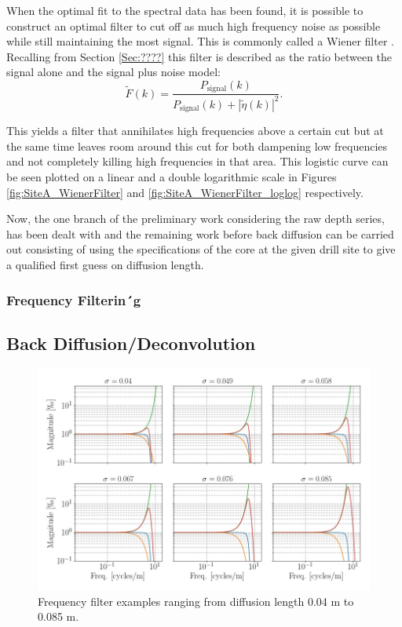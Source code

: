 \documentclass[../../CompleteThesis/Complete_1stDraft.tex]{subfiles}
\begin{document}
When the optimal fit to the spectral data has been found, it is possible to construct an optimal filter to cut off as much high frequency noise as possible while still maintaining the most signal. This is commonly called a Wiener filter . Recalling from Section \ref{Sec:????} this filter is described as the ratio between the signal alone and the signal plus noise model:
\begin{equation}
	\tilde{F}(k) = \frac{P_{\text{signal}}(k)}{P_{\text{signal}}(k) + |\tilde{\eta}(k)|^2}.
	\label{Eq:MethodWienerFilter}
\end{equation}

This yields a filter that annihilates high frequencies above a certain cut but at the same time leaves room around this cut for both dampening low frequencies and not completely killing high frequencies  in that area. 
This logistic curve can be seen plotted on a linear and a double logarithmic scale in Figures \ref{fig:SiteA_WienerFilter} and \ref{fig:SiteA_WienerFilter_loglog} respectively.

Now, the one branch of the preliminary work considering the raw depth series, has been dealt with and the remaining work before back diffusion can be carried out consisting of using the specifications of the core at the given drill site to give a qualified first guess on diffusion length.

\subsubsection[Frequency Filters]{Frequency Filterin´g}
\label{Subsubsec:Method_FirstSigmaEstimate_BackDiffusion_FrequencyFilters}

\subsection[Back Diffusion]{Back Diffusion/Deconvolution}
\label{Subsec:Method_FirstSigmaEstimate_BackDiffusion}
\begin{figure}[h]
	\centering
	\includegraphics[width=\textwidth]{SiteA_filtersEx.jpg}
	\caption[Frequency filters example, Site A]{Frequency filter examples ranging from diffusion length 0.04 m to 0.085 m.}
	\label{fig:SiteA_filtersEx}
\end{figure}
\end{document}
